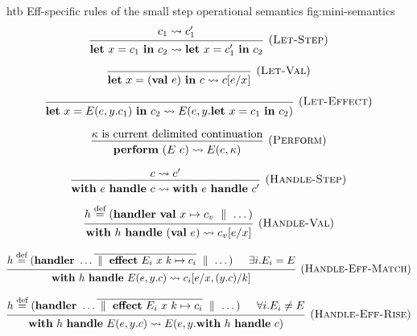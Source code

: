 \documentclass[class=article, crop=false]{standalone}
\begin{document}
\begin{myfigure}[1]{htb}
  {Eff-specific rules of the small step operational semantics}
  {fig:mini-semantics}
  $$
  \begin{prooftree}
    \hypo{c_1 \leadsto c_1'}
    \infer1[(\textsc{Let-Step})]{\effLet x = c_1 \effIn c_2 \leadsto \effLet x = c_1' \effIn c_2}
  \end{prooftree}
  $$

  $$
  \begin{prooftree}
    \hypo{}
    \infer1[(\textsc{Let-Val})]{\effLet x = (\effVal e) \effIn c \leadsto c[e/x]}
  \end{prooftree}
  $$
  
  $$
  \begin{prooftree}
    \hypo{}
    \infer1[(\textsc{Let-Effect})]{\effLet x = E(e, y.c_1) \effIn c_2 \leadsto E(e, y.\effLet x = c_1 \effIn c_2)}
  \end{prooftree}
  $$

  $$
    \begin{prooftree}
      \hypo{\kappa \text{ is current delimited continuation}}
      \infer1[(\textsc{Perform})]{\effPerform (E\ e) \leadsto E(e, \kappa)}
    \end{prooftree}
    $$

    $$
    \begin{prooftree}
      \hypo{c \leadsto c'}
      \infer1[(\textsc{Handle-Step})]{\effWith e \effHandle c \leadsto \effWith e \effHandle c'}
    \end{prooftree}
    $$
    
    $$
    \begin{prooftree}
      \hypo{h \stackrel{\text{def}}{=} (\effHandler \effVal x \mapsto c_v \dmid \dots)}
      \infer1[(\textsc{Handle-Val})]{\effWith h \effHandle (\effVal e) \leadsto c_v[e/x]}
    \end{prooftree}
    $$
    
    $$
    \begin{prooftree}
      \hypo{h \stackrel{\text{def}}{=} (\effHandler \dots \overline{\dmid \effEffect E_i\ x\ k \mapsto c_i} \dmid \dots)}
      \hypo{\exists i. E_i = E}
      \infer2[(\textsc{Handle-Eff-Match})]{\effWith h \effHandle E(e, y.c) \leadsto c_i[e/x, (y.c)/k]}
    \end{prooftree}
    $$
    
    $$
    \begin{prooftree}
      \hypo{h \stackrel{\text{def}}{=} (\effHandler \dots \overline{\dmid \effEffect E_i\ x\ k \mapsto c_i} \dmid \dots)}
      \hypo{\forall i. E_i \neq E}
      \infer2[(\textsc{Handle-Eff-Rise})]{\effWith h \effHandle E(e, y.c) \leadsto E( e, y. \effWith h \effHandle c)}
    \end{prooftree}
    $$
\end{myfigure}
\end{document}
